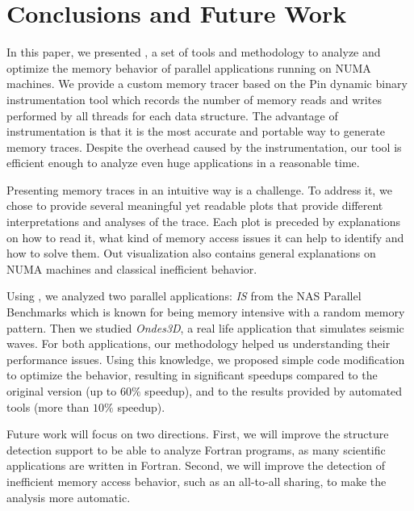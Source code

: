 
\section{Conclusions and Future Work}
\label{sec:concl}

In this paper, we presented \TABARNAC, a set of tools and methodology to analyze and
optimize the memory behavior of parallel applications running on NUMA
machines. We provide a custom memory tracer
based on the Pin dynamic binary instrumentation tool which records the
number of memory reads and writes performed by all threads for each data structure.
The advantage of instrumentation is that it is the most
accurate and portable way to generate memory traces.
Despite the overhead caused by the instrumentation, our tool is efficient enough to analyze even huge applications in a reasonable time.

Presenting memory traces in an intuitive way is a challenge. To address it, we
chose to provide several meaningful yet readable plots that provide different
interpretations and analyses of the trace. Each plot is preceded by
explanations on how to read it, what kind of memory access issues it can help
to identify and how to solve them.  Out visualization also contains general
explanations on NUMA machines and classical inefficient behavior.

Using \TABARNAC, we analyzed two parallel applications: \emph{IS} from the NAS
Parallel Benchmarks which is known for being memory intensive with a random
memory pattern. Then we studied \emph{Ondes3D}, a real life application that
simulates seismic waves. For both applications, our methodology helped us
understanding their performance issues.  Using this knowledge, we proposed
simple code modification to optimize the behavior, resulting in significant
speedups compared to the original version (up to $60\%$ speedup), and to the
results provided by automated tools (more than $10\%$ speedup).

Future work will focus on two directions. First, we will improve the
structure detection support to be able to analyze Fortran programs, as many
scientific applications are written in Fortran. Second, we will improve the
detection of inefficient memory access behavior, such as an all-to-all
sharing, to make the analysis more automatic.

